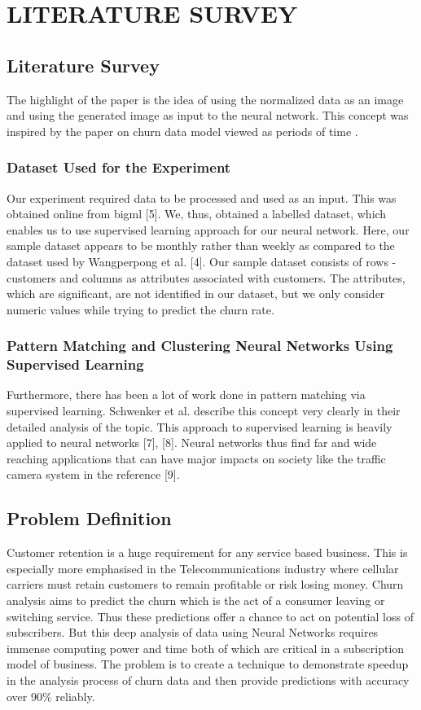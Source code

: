 

\chapter{LITERATURE SURVEY}

\section{Literature Survey}

\hspace{0.9cm} The highlight of the paper is the idea of using the normalized
data as an image and using the generated image as input
to the neural network. This concept was inspired by the paper
on churn data model viewed as periods of time \cite{citation-2}.
\subsection{Dataset Used for the Experiment}
Our experiment required data to be processed and used
as an input. This was obtained online from bigml [5]. We,
thus, obtained a labelled dataset, which enables us to use
supervised learning approach for our neural network. Here,
our sample dataset appears to be monthly rather than weekly
as compared to the dataset used by Wangperpong et al. [4].
Our sample dataset consists of rows - customers and columns
as attributes associated with customers. The attributes, which
are significant, are not identified in our dataset, but we only
consider numeric values while trying to predict the churn rate.
\subsection{Pattern Matching and Clustering Neural Networks Using Supervised Learning}
Furthermore, there has been a lot of work done in pattern
matching via supervised learning. Schwenker et al. \cite{citation-3} describe
this concept very clearly in their detailed analysis of the
topic. This approach to supervised learning is heavily applied
to neural networks [7], [8]. Neural networks thus find far and
wide reaching applications that can have major impacts on
society like the traffic camera system in the reference [9].

\section{Problem Definition}

\hspace{0.9cm} Customer retention is a huge requirement for any service based business. This is especially more emphasised in the Telecommunications industry where cellular carriers must retain customers to remain profitable or risk losing money. Churn analysis aims to predict the churn which is the act of a consumer leaving or switching service. Thus these predictions offer a chance to act on potential loss of subscribers. But this deep analysis of data using Neural Networks requires immense computing power and time both of which are critical in a subscription model of business. The problem is to create a technique to demonstrate speedup in the analysis process of churn data and then provide predictions with accuracy over 90\% reliably.

